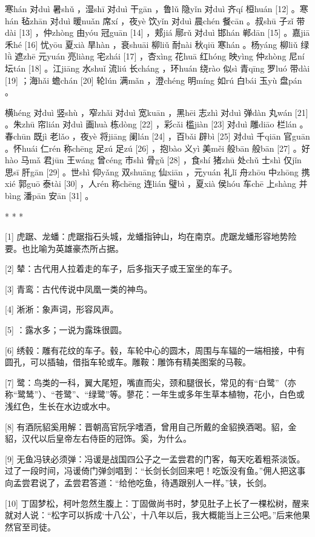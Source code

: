 \documentclass[12pt,UTF8]{ctexbook}
\begin{document}
寒hán 对duì 暑shǔ ，湿shī 对duì 干gān ，鲁lǔ 隐yǐn 对duì 齐qí 桓huán [12] 。寒hán 毡zhān 对duì 暖nuǎn 席xí ，夜yè 饮yǐn 对duì 晨chén 餐cān 。叔shū 子zǐ 带dài [13] ，仲zhòng 由yóu 冠guān [14] ，郏jiá 鄏rǔ 对duì 邯hán 郸dān [15] 。嘉jiā 禾hé [16] 忧yōu 夏xià 旱hàn ，衰shuāi 柳liǔ 耐nài 秋qiū 寒hán 。杨yáng 柳liǔ 绿lǜ 遮zhē 元yuán 亮liàng 宅zhái [17] ，杏xìng 花huā 红hóng 映yìng 仲zhòng 尼ní 坛tán [18] 。江jiāng 水shuǐ 流liú 长cháng ，环huán 绕rào 似sì 青qīng 罗luó 带dài [19] ；海hǎi 蟾chán [20] 轮lún 满mǎn ，澄chéng 明míng 如rú 白bái 玉yù 盘pán 。

横héng 对duì 竖shù ，窄zhǎi 对duì 宽kuān ，黑hēi 志zhì 对duì 弹dàn 丸wán [21] 。朱zhū 帘lián 对duì 画huà 栋dòng [22] ，彩cǎi 槛jiàn [23] 对duì 雕diāo 栏lán 。春chūn 既jì 老lǎo ，夜yè 将jiāng 阑lán [24] ，百bǎi 辟bì [25] 对duì 千qiān 官guān 。怀huái 仁rén 称chēng 足zú 足zú [26] ，抱bào 义yì 美měi 般bān 般bān [27] 。好hào 马mǎ 君jūn 王wáng 曾céng 市shì 骨gǔ [28] ，食shí 猪zhū 处chǔ 士shì 仅jǐn 思sī 肝gān [29] 。世shì 仰yǎng 双shuāng 仙xiān ，元yuán 礼lǐ 舟zhōu 中zhōng 携xié 郭guō 泰tài [30] ，人rén 称chēng 连lián 璧bì ，夏xià 侯hóu 车chē 上shàng 并bìng 潘pān 安ān [31] 。



* * *



[1] 虎踞、龙蟠：虎踞指石头城，龙蟠指钟山，均在南京。虎踞龙蟠形容地势险要。也比喻为英雄豪杰所占据。

[2] 辇：古代用人拉着走的车子，后多指天子或王室坐的车子。

[3] 青鸾：古代传说中凤凰一类的神鸟。

[4] 淅淅：象声词，形容风声。

[5] ：露水多；一说为露珠很圆。

[6] 绣毂：雕有花纹的车子。毂，车轮中心的圆木，周围与车辐的一端相接，中有圆孔，可以插轴，借指车轮或车。雕鞍：雕饰有精美图案的马鞍。

[7] 鹭：鸟类的一科，翼大尾短，嘴直而尖，颈和腿很长，常见的有“白鹭”（亦称“鹭鸶”）、“苍鹭”、“绿鹭”等。蓼花：一年生或多年生草本植物，花小，白色或浅红色，生长在水边或水中。

[8] 有酒阮貂奚用解：晋朝高官阮孚嗜酒，曾用自己所戴的金貂换酒喝。貂，金貂，汉代以后皇帝左右侍臣的冠饰。奚，为什么。

[9] 无鱼冯铗必须弹：冯谖是战国四公子之一孟尝君的门客，每天吃着粗茶淡饭。过了一段时间，冯谖倚门弹剑唱到：“长剑长剑回来吧！吃饭没有鱼。”佣人把这事向孟尝君说了，孟尝君答道：“给他吃鱼，待遇跟别人一样。”铗，长剑。

[10] 丁固梦松，柯叶忽然生腹上：丁固做尚书时，梦见肚子上长了一棵松树，醒来就对人说：“松字可以拆成‘十八公’，十八年以后，我大概能当上三公吧。”后来他果然官至司徒。
\end{document}
